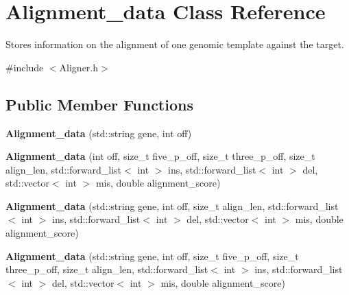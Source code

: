 \hypertarget{structAlignment__data}{}\section{Alignment\+\_\+data Class Reference}
\label{structAlignment__data}


Stores information on the alignment of one genomic template against the target.  




{\ttfamily \#include $<$Aligner.\+h$>$}

\subsection*{Public Member Functions}
\begin{DoxyCompactItemize}
\item 
\mbox{\label{structAlignment__data_a6ef5a876003a9e52b2aec68a1589f518}} 
{\bfseries Alignment\+\_\+data} (std\+::string gene, int off)
\item 
\mbox{\label{structAlignment__data_a37990bfc1ad4908cc21156569cbea5e6}} 
{\bfseries Alignment\+\_\+data} (int off, size\+\_\+t five\+\_\+p\+\_\+off, size\+\_\+t three\+\_\+p\+\_\+off, size\+\_\+t align\+\_\+len, std\+::forward\+\_\+list$<$ int $>$ ins, std\+::forward\+\_\+list$<$ int $>$ del, std\+::vector$<$ int $>$ mis, double alignment\+\_\+score)
\item 
\mbox{\label{structAlignment__data_ae1193f97b177aa3812b0623147f8c196}} 
{\bfseries Alignment\+\_\+data} (std\+::string gene, int off, size\+\_\+t align\+\_\+len, std\+::forward\+\_\+list$<$ int $>$ ins, std\+::forward\+\_\+list$<$ int $>$ del, std\+::vector$<$ int $>$ mis, double alignment\+\_\+score)
\item 
\mbox{\label{structAlignment__data_a67c0cefecc003f5d9601d6a8094881aa}} 
{\bfseries Alignment\+\_\+data} (std\+::string gene, int off, size\+\_\+t five\+\_\+p\+\_\+off, size\+\_\+t three\+\_\+p\+\_\+off, size\+\_\+t align\+\_\+len, std\+::forward\+\_\+list$<$ int $>$ ins, std\+::forward\+\_\+list$<$ int $>$ del, std\+::vector$<$ int $>$ mis, double alignment\+\_\+score)
\end{DoxyCompactItemize}
